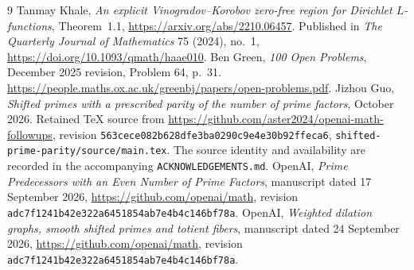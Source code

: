 \documentclass[11pt,a4paper]{article}
\begin{document}
\clearpage
\begingroup
\setlength{\parskip}{0pt}
\tableofcontents
\endgroup

\clearpage

\clearpage

\clearpage

\clearpage

\clearpage

\clearpage

\clearpage

\clearpage

\clearpage

\clearpage

\clearpage

\clearpage


\appendix
\clearpage

\clearpage


\clearpage
\begin{thebibliography}{9}
Tanmay Khale, \emph{An explicit Vinogradov--Korobov zero-free region for
Dirichlet $L$-functions}, Theorem~1.1,
\url{https://arxiv.org/abs/2210.06457}.
Published in \emph{The Quarterly Journal of Mathematics} 75 (2024), no.~1,
\url{https://doi.org/10.1093/qmath/haae010}.
Ben Green, \emph{100 Open Problems}, December 2025 revision,
Problem 64, p.~31.
\url{https://people.maths.ox.ac.uk/greenbj/papers/open-problems.pdf}.
Jizhou Guo, \emph{Shifted primes with a prescribed parity of the number of
prime factors}, October 2026. Retained TeX source from
\url{https://github.com/aster2024/openai-math-followups}, revision
\nolinkurl{563cece082b628dfe3ba0290c9e4e30b92ffeca6},
\nolinkurl{shifted-prime-parity/source/main.tex}.
The source identity and availability are recorded in the accompanying
\nolinkurl{ACKNOWLEDGEMENTS.md}.
OpenAI, \emph{Prime Predecessors with an Even Number of Prime Factors},
manuscript dated 17 September 2026, \url{https://github.com/openai/math},
revision \nolinkurl{adc7f1241b42e322a6451854ab7e4b4c146bf78a}.
OpenAI, \emph{Weighted dilation graphs, smooth shifted primes and totient
fibers}, manuscript dated 24 September 2026,
\url{https://github.com/openai/math},
revision \nolinkurl{adc7f1241b42e322a6451854ab7e4b4c146bf78a}.
\end{thebibliography}
\end{document}
